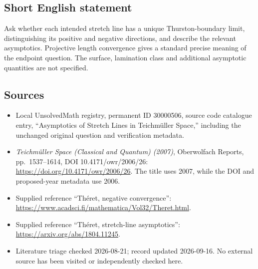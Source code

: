 \documentclass[11pt]{article}
\begin{document}
\subsection{Short English statement}
Ask whether each intended stretch line has a unique Thurston-boundary limit, distinguishing its positive and negative directions, and describe the relevant asymptotics. Projective length convergence gives a standard precise meaning of the endpoint question. The surface, lamination class and additional asymptotic quantities are not specified.
\subsection{Sources}
\begin{itemize}
\item Local UnsolvedMath registry, permanent ID 30000506, source code catalogue entry, ``Asymptotics of Stretch Lines in Teichm\"uller Space,'' including the unchanged original question and verification metadata.
\item \emph{Teichm\"uller Space (Classical and Quantum) (2007)}, Oberwolfach Reports, pp.\ 1537--1614, DOI 10.4171/owr/2006/26: \url{https://doi.org/10.4171/owr/2006/26}. The title uses 2007, while the DOI and proposed-year metadata use 2006.
\item Supplied reference ``Th\'eret, negative convergence'': \url{https://www.acadsci.fi/mathematica/Vol32/Theret.html}.
\item Supplied reference ``Th\'eret, stretch-line asymptotics'': \url{https://arxiv.org/abs/1804.11245}.
\item Literature triage checked 2026-08-21; record updated 2026-09-16. No external source has been visited or independently checked here.
\end{itemize}
\end{document}

